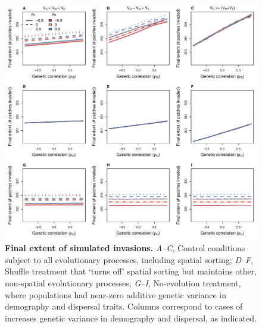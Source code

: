 \documentclass[11pt]{article}
\begin{document}
\renewcommand{\thefigure}{A\arabic{figure}}
\setcounter{figure}{0}
\newpage{}
\begin{figure}[h!]
\centering
\includegraphics[width=1\linewidth]{Figures/app_fig_extent}
\caption{\textbf{Final extent of simulated invasions.} \textit{A--C}, Control conditions subject to all evolutionary processes, including spatial sorting; \textit{D--F}, Shuffle treatment that `turns off' spatial sorting but maintains other, non-spatial evolutionary processes; \textit{G--I}, No-evolution treatment, where populations had near-zero additive genetic variance in demography and dispersal traits. Columns correspond to cases of increases genetic variance in demography and dispersal, as indicated.}
\label{corr:app_fig_extent}
\end{figure}
\end{document}
